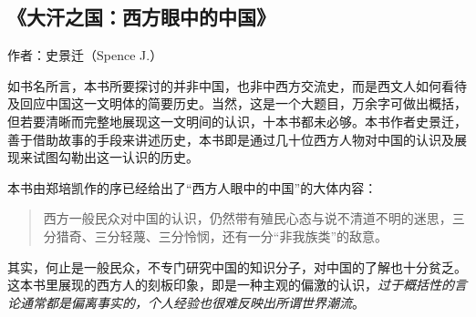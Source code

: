 \subsection{《大汗之国：西方眼中的中国》}

作者：史景迁（Spence J.）

如书名所言，本书所要探讨的并非中国，也非中西方交流史，而是西文人如何看待及回应中国这一文明体的简要历史。当然，这是一个大题目，万余字可做出概括，但若要清晰而完整地展现这一文明间的认识，十本书都未必够。本书作者史景迁，善于借助故事的手段来讲述历史，本书即是通过几十位西方人物对中国的认识及展现来试图勾勒出这一认识的历史。

本书由郑培凯作的序已经给出了“西方人眼中的中国”的大体内容：
\begin{quotation}
西方一般民众对中国的认识，仍然带有殖民心态与说不清道不明的迷思，三分猎奇、三分轻蔑、三分怜悯，还有一分“非我族类”的敌意。
\end{quotation}

其实，何止是一般民众，不专门研究中国的知识分子，对中国的了解也十分贫乏。这本书里展现的西方人的刻板印象，即是一种主观的偏激的认识，\emph{过于概括性的言论通常都是偏离事实的，个人经验也很难反映出所谓世界潮流}。

